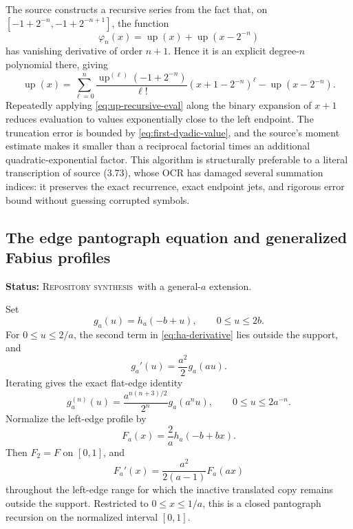 \documentclass[11pt,oneside]{article}
\theoremstyle{definition}
\theoremstyle{remark}
\newcommand{\Up}{\operatorname{up}}
\newcommand{\RepoStatus}{\textcolor{RepoOlive}{\textsc{Repository synthesis}}}
\newcommand{\status}[1]{\par\smallskip\noindent\textbf{Status:} #1.\par\smallskip}
\begin{document}
The source constructs a recursive series from the fact that, on
\([-1+2^{-n},-1+2^{-n+1}]\), the function
\begin{equation}
  \varphi_n(x)=\Up(x)+\Up(x-2^{-n})
  \label{eq:phi-n}
\end{equation}
has vanishing derivative of order \(n+1\).  Hence it is an explicit degree-\(n\) polynomial there, giving
\begin{equation}
  \Up(x)=\sum_{\ell=0}^{n}
   \frac{\Up^{(\ell)}(-1+2^{-n})}{\ell!}
   (x+1-2^{-n})^\ell-\Up(x-2^{-n}).
  \label{eq:up-recursive-eval}
\end{equation}
Repeatedly applying \eqref{eq:up-recursive-eval} along the binary expansion of \(x+1\) reduces evaluation to values exponentially close to the left endpoint.  The truncation error is bounded by \eqref{eq:first-dyadic-value}, and the source's moment estimate makes it smaller than a reciprocal factorial times an additional quadratic-exponential factor.  This algorithm is structurally preferable to a literal transcription of source (3.73), whose OCR has damaged several summation indices: it preserves the exact recurrence, exact endpoint jets, and rigorous error bound without guessing corrupted symbols.

\subsection{The edge pantograph equation and generalized Fabius profiles}
\status{\RepoStatus\ with a general-\(a\) extension}

Set
\begin{equation}
  g_a(u)=h_a(-b+u),
  \qquad 0\le u\le2b.
  \label{eq:ga-edge}
\end{equation}
For \(0\le u\le2/a\), the second term in \eqref{eq:ha-derivative} lies outside the support, and
\begin{equation}
  g_a'(u)=\frac{a^2}{2}g_a(au).
  \label{eq:ga-pantograph}
\end{equation}
Iterating gives the exact flat-edge identity
\begin{equation}
  g_a^{(n)}(u)=\frac{a^{n(n+3)/2}}{2^n}g_a(a^n u),
  \qquad 0\le u\le2a^{-n}.
  \label{eq:ga-iterated}
\end{equation}
Normalize the left-edge profile by
\begin{equation}
  F_a(x)=\frac2a h_a(-b+bx).
  \label{eq:Fa-general}
\end{equation}
Then \(F_2=F\) on \([0,1]\), and
\begin{equation}
  F_a'(x)=\frac{a^2}{2(a-1)}F_a(ax)
  \label{eq:Fa-pantograph}
\end{equation}
throughout the left-edge range for which the inactive translated copy remains outside the support.  Restricted to \(0\le x\le1/a\), this is a closed pantograph recursion on the normalized interval \([0,1]\).
\end{document}
